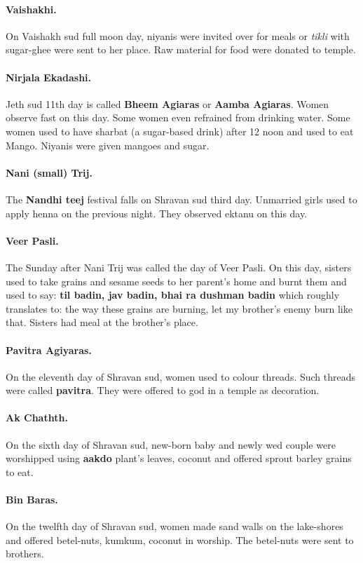 \paragraph{Vaishakhi.} On Vaishakh sud full moon day, niyanis
were invited over for meals or \textit{tikli} with sugar-ghee were sent to her
place. Raw material for food were donated to temple. 
\paragraph{Nirjala
Ekadashi.} Jeth sud 11th day is called \textbf{Bheem Agiaras} or \textbf{Aamba
Agiaras}. Women observe fast on this day. Some women even refrained from
drinking water. Some women used to have sharbat (a sugar-based drink) after 12
noon and used to eat Mango. Niyanis were given mangoes and sugar.

\paragraph{Nani (small) Trij.} The \textbf{Nandhi teej} festival falls on
Shravan sud third day. Unmarried girls used to apply henna on the previous
night. They observed ektanu on this day.
\paragraph{Veer Pasli.} The Sunday
after Nani Trij was called the day of Veer Pasli. On this day, 
sisters used to take grains and sesame seeds to her parent's home and burnt
them and used to say: \textbf{til badin, jav badin, bhai ra dushman badin}
which roughly translates to: the way these grains are burning, let my brother's
enemy burn like that. Sisters had meal at the brother's place.
\paragraph{Pavitra
Agiyaras.} On the eleventh day of Shravan sud, women used to colour threads.
Such threads were called \textbf{pavitra}. They were offered to god in a temple
as decoration. 
\paragraph{Ak Chathth.} On the sixth day of Shravan sud,
new-born baby and newly wed couple were worshipped using \textbf{aakdo} plant's
leaves, coconut and offered sprout barley grains to eat. 
\paragraph{Bin
Baras.} On the twelfth day of Shravan sud, women made sand walls on the
lake-shores and offered betel-nuts, kumkum, coconut in worship. The betel-nuts
were sent to brothers.

